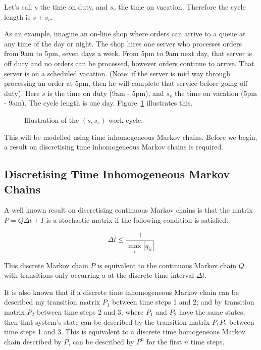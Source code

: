 \documentclass{article}
\begin{document}

Let’s call $s$ the time on duty, and $s_v$ the time on vacation.
Therefore the cycle length is $s + s_v$.

As an example, imagine an on-line shop where orders can arrive to a queue at any time of the day or night.
The shop hires one server who processes orders from 9am to 5pm, seven days a week.
From 5pm to 9am next day, that server is off duty and no orders can be processed, however orders continue to arrive.
That server is on a scheduled vacation.
(Note: if the server is mid way through processing an order at 5pm, then he will complete that service before going off duty).
Here $s$ is the time on duty (9am - 5pm), and $s_v$ the time on vacation (5pm - 9am).
The cycle length is one day.
Figure~\ref{fig:onoffdutycycle} illustrates this.

\begin{figure}[!hbtp]
\begin{center}
  
  \caption{Illustration of the $(s, s_v)$ work cycle.}
  \label{fig:onoffdutycycle}
\end{center}
\end{figure}

This will be modelled using time inhomogeneous Markov chains.
Before we begin, a result on discretising time inhomogeneous Markov chains is required.

\subsection{Discretising Time Inhomogeneous Markov Chains}

A well known result \cite{stewart09} on discretising continuous Markov chains is that the matrix $P = Q \Delta t + I$ is a stochastic matrix if the following condition is satisfied:

\begin{equation}
\Delta t \leq \frac{1}{\max_i |q_{ii}|}
\end{equation}

This discrete Markov chain $P$ is equivalent to the continuous Markov chain $Q$ with transitions only occurring a at the discrete time interval $\Delta t$.

It is also known that if a discrete time inhomogeneous Markov chain can be described my transition matrix $P_1$ between time steps 1 and 2; and by transition matrix $P_2$  between time steps 2 and 3, where $P_1$ and $P_2$ have the same states, then that system's state can be described by the transition matrix $P_1 P_2$ between time steps 1 and 3.
This is equivalent to a discrete time homogeneous Markov chain described by $P$, can be described by $P^n$ for the first $n$ time steps.
\end{document}
